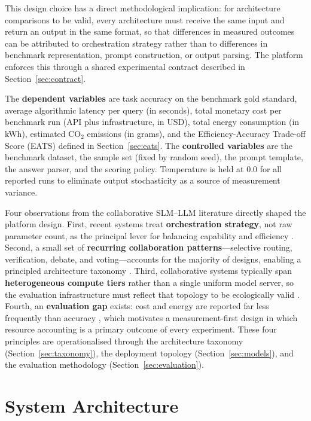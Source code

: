 This design choice has a direct methodological implication: for architecture comparisons to be valid, every architecture must receive the same input and return an output in the same format, so that differences in measured outcomes can be attributed to orchestration strategy rather than to differences in benchmark representation, prompt construction, or output parsing. The platform enforces this through a shared experimental contract described in Section~\ref{sec:contract}.

The \textbf{dependent variables} are task accuracy on the benchmark gold standard, average algorithmic latency per query (in seconds), total monetary cost per benchmark run (API plus infrastructure, in USD), total energy consumption (in kWh), estimated CO$_2$ emissions (in grams), and the Efficiency-Accuracy Trade-off Score (EATS) defined in Section~\ref{sec:eats}. The \textbf{controlled variables} are the benchmark dataset, the sample set (fixed by random seed), the prompt template, the answer parser, and the scoring policy. Temperature is held at 0.0 for all reported runs to eliminate output stochasticity as a source of measurement variance.

Four observations from the collaborative SLM--LLM literature directly shaped the platform design. First, recent systems treat \textbf{orchestration strategy}, not raw parameter count, as the principal lever for balancing capability and efficiency \cite{hao2024hybrid, shao2025dot, multiagent2025}. Second, a small set of \textbf{recurring collaboration patterns}---selective routing, verification, debate, and voting---accounts for the majority of designs, enabling a principled architecture taxonomy \cite{oh2025uncertainty, citer2025, debateagents2025, sentensemble2026}. Third, collaborative systems typically span \textbf{heterogeneous compute tiers} rather than a single uniform model server, so the evaluation infrastructure must reflect that topology to be ecologically valid \cite{hao2024hybrid, oh2025uncertainty, shao2025dot}. Fourth, an \textbf{evaluation gap} exists: cost and energy are reported far less frequently than accuracy \cite{slrmanuscript2026, energytoken2025}, which motivates a measurement-first design in which resource accounting is a primary outcome of every experiment. These four principles are operationalised through the architecture taxonomy (Section~\ref{sec:taxonomy}), the deployment topology (Section~\ref{sec:models}), and the evaluation methodology (Section~\ref{sec:evaluation}).

\section{System Architecture}
\label{sec:sysarch}

